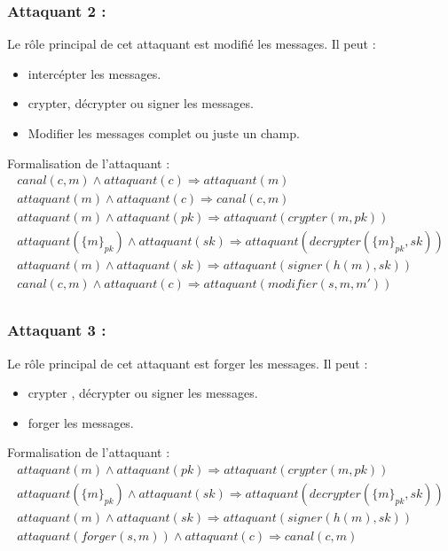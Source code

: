 \documentclass[10pt,a4paper]{article}
\begin{document}
\subsubsection{Attaquant 2 :}
Le rôle principal de cet attaquant est modifié les messages. Il peut :
\begin{itemize}
\item intercépter les messages.
\item crypter, décrypter ou signer les messages.
\item Modifier les messages complet ou juste un champ.\\
\end{itemize}
Formalisation de l'attaquant :   
\[
\begin{array}{l}
canal(c,m)\wedge attaquant(c)\Longrightarrow attaquant(m)\\
attaquant(m)\wedge attaquant(c)\Longrightarrow canal(c,m)\\
attaquant(m)\wedge attaquant(pk)\Longrightarrow attaquant(crypter(m,pk))\\
attaquant({\lbrace m \rbrace}_{pk}) \wedge attaquant(sk)\Longrightarrow attaquant(decrypter({\lbrace m \rbrace}_{pk},sk))\\ 
attaquant(m)\wedge attaquant(sk)\Longrightarrow attaquant(signer(h(m),sk))\\
canal(c,m)\wedge attaquant(c)\Longrightarrow attaquant(modifier(s,m,m'))\\
  
  \end{array}
\]

\subsubsection{Attaquant 3 :}
Le rôle principal de cet attaquant est forger les messages. Il peut :
\begin{itemize}
\item crypter , décrypter ou signer les messages.
\item forger les messages.\\
\end{itemize}
Formalisation de l'attaquant :   
\[
\begin{array}{l}
attaquant(m)\wedge attaquant(pk)\Longrightarrow attaquant(crypter(m,pk))\\
attaquant({\lbrace m \rbrace}_{pk}) \wedge attaquant(sk)\Longrightarrow attaquant(decrypter({\lbrace m \rbrace}_{pk},sk))\\ 
attaquant(m)\wedge attaquant(sk)\Longrightarrow attaquant(signer(h(m),sk))\\
attaquant(forger(s,m))\wedge attaquant(c)\Longrightarrow canal(c,m)\\
 
  \end{array}
\]
\end{document}
